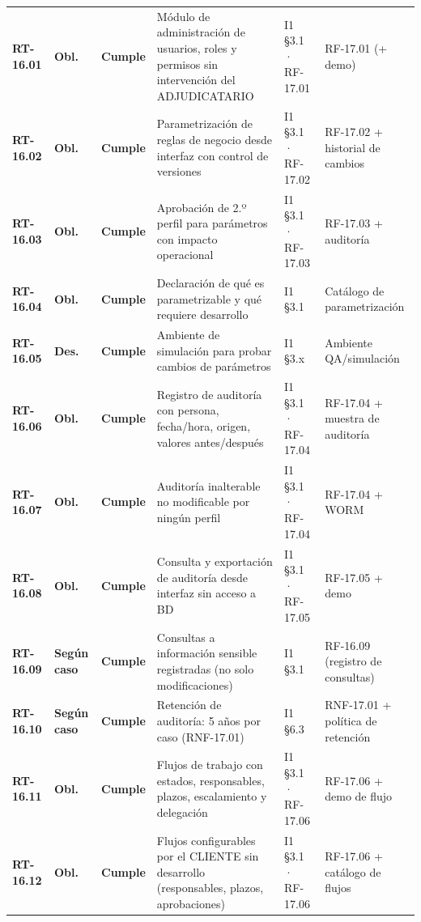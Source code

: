 \begin{small}
\begin{longtable}{@{}p{1.35cm} p{1.15cm} p{1.15cm} p{4.6cm} p{2.35cm} p{3.8cm}@{}}
\textbf{RT-16.01} & \textbf{Obl.} & \textbf{Cumple} & M\'odulo de administraci\'on de usuarios, roles y permisos sin intervenci\'on del ADJUDICATARIO & I1 §3.1 · RF-17.01 & RF-17.01 (+ demo) \\
\textbf{RT-16.02} & \textbf{Obl.} & \textbf{Cumple} & Parametrizaci\'on de reglas de negocio desde interfaz con control de versiones & I1 §3.1 · RF-17.02 & RF-17.02 + historial de cambios \\
\textbf{RT-16.03} & \textbf{Obl.} & \textbf{Cumple} & Aprobaci\'on de 2.º perfil para par\'ametros con impacto operacional & I1 §3.1 · RF-17.03 & RF-17.03 + auditor\'ia \\
\textbf{RT-16.04} & \textbf{Obl.} & \textbf{Cumple} & Declaraci\'on de qu\'e es parametrizable y qu\'e requiere desarrollo & I1 §3.1 & Cat\'alogo de parametrizaci\'on \\
\textbf{RT-16.05} & \textbf{Des.} & \textbf{Cumple} & Ambiente de simulaci\'on para probar cambios de par\'ametros & I1 §3.x & Ambiente QA/simulaci\'on \\
\textbf{RT-16.06} & \textbf{Obl.} & \textbf{Cumple} & Registro de auditor\'ia con persona, fecha/hora, origen, valores antes/despu\'es & I1 §3.1 · RF-17.04 & RF-17.04 + muestra de auditor\'ia \\
\textbf{RT-16.07} & \textbf{Obl.} & \textbf{Cumple} & Auditor\'ia inalterable no modificable por ning\'un perfil & I1 §3.1 · RF-17.04 & RF-17.04 + WORM \\
\textbf{RT-16.08} & \textbf{Obl.} & \textbf{Cumple} & Consulta y exportaci\'on de auditor\'ia desde interfaz sin acceso a BD & I1 §3.1 · RF-17.05 & RF-17.05 + demo \\
\textbf{RT-16.09} & \textbf{Según caso} & \textbf{Cumple} & Consultas a informaci\'on sensible registradas (no solo modificaciones) & I1 §3.1 & RF-16.09 (registro de consultas) \\
\textbf{RT-16.10} & \textbf{Según caso} & \textbf{Cumple} & Retenci\'on de auditor\'ia: 5 a\~nos por caso (RNF-17.01) & I1 §6.3 & RNF-17.01 + pol\'itica de retenci\'on \\
\textbf{RT-16.11} & \textbf{Obl.} & \textbf{Cumple} & Flujos de trabajo con estados, responsables, plazos, escalamiento y delegaci\'on & I1 §3.1 · RF-17.06 & RF-17.06 + demo de flujo \\
\textbf{RT-16.12} & \textbf{Obl.} & \textbf{Cumple} & Flujos configurables por el CLIENTE sin desarrollo (responsables, plazos, aprobaciones) & I1 §3.1 · RF-17.06 & RF-17.06 + cat\'alogo de flujos \\

\end{longtable}
\end{small}
